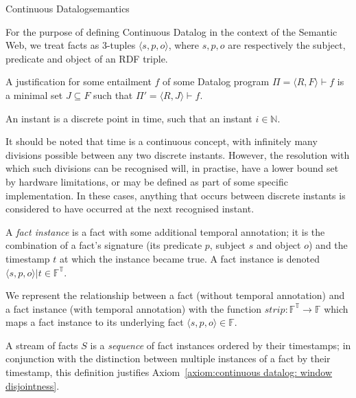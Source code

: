 \begin{nestedsection}{Continuous Datalog}{semantics}
\begin{definition}
For the purpose of defining Continuous Datalog in the context of the
Semantic Web, we treat facts as 3-tuples $\langle s, p, o \rangle$,
where $s, p, o$ are respectively the subject, predicate and object of
an RDF triple. 
\end{definition}

\begin{definition}
A justification for some entailment $f$ of some Datalog program
${\Pi = \langle R , F \rangle \vdash f}$ is a minimal set ${J \subseteq F}$
such that ${\Pi' = \langle R , J \rangle \vdash f}$.
\end{definition}

\begin{definition}[Instant]
An instant is a discrete point in time, such that an instant 
${i \in \mathbb{N}}$.

It should be noted that time is a continuous concept, with infinitely
many divisions possible between any two discrete instants.  However,
the resolution with which such divisions can be recognised will, in
practise, have a lower bound set by hardware limitations, or may be
defined as part of some specific implementation.  In these cases,
anything that occurs between discrete instants is considered to have
occurred at the next recognised instant.
\end{definition}

\begin{definition}
A {\em fact instance} is a fact with some additional temporal annotation;
it is the combination of a fact's signature (its predicate $p$, subject
$s$ and object $o$) and the timestamp $t$ at which the instance became true.
A fact instance is denoted ${\langle s, p, o \rangle | t \in \mathbb{F^T}}$.

We represent the relationship between a fact (without temporal
annotation) and a fact instance (with temporal annotation) with the
function ${strip : \mathbb{F^T} \rightarrow \mathbb{F}}$ which maps a fact instance to its
underlying fact ${\langle s, p, o \rangle \in \mathbb{F}}$.
\end{definition}

\begin{definition}
A stream of facts $S$ is a \emph{sequence} of fact instances ordered
by their timestamps; in conjunction with the distinction between
multiple instances of a fact by their timestamp, this definition justifies
Axiom~\ref{axiom:continuous datalog: window disjointness}.
\end{definition}


\end{nestedsection}
